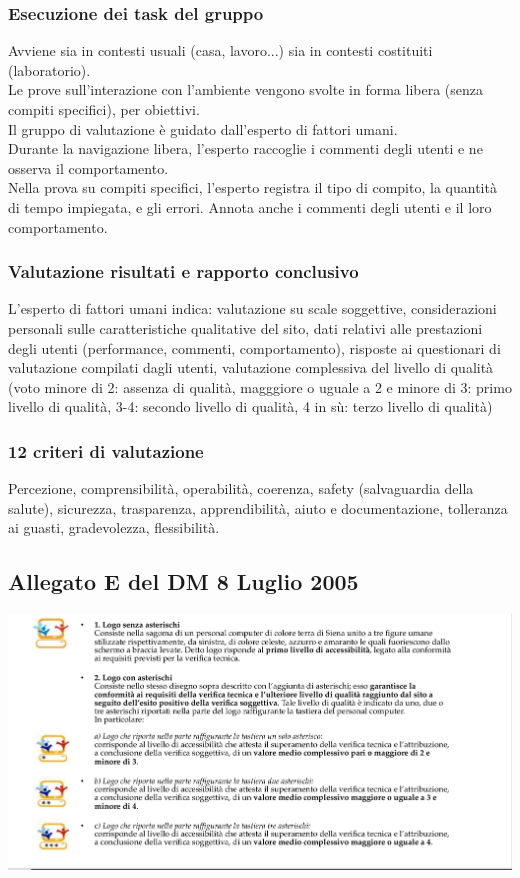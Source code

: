 \documentclass{article}
\begin{document}
\subsubsection{Esecuzione dei task del gruppo}
Avviene sia in contesti usuali (casa, lavoro...) sia in contesti costituiti (laboratorio).\\
Le prove sull'interazione con l'ambiente vengono svolte in forma libera (senza compiti specifici), per obiettivi.\\
Il gruppo di valutazione è guidato dall'esperto di fattori umani.\\
Durante la navigazione libera, l'esperto raccoglie i commenti degli utenti e ne osserva il comportamento.\\
Nella prova su compiti specifici, l'esperto registra il tipo di compito, la quantità di tempo impiegata, e gli errori. Annota anche i commenti degli utenti e il loro comportamento.
\subsubsection{Valutazione risultati e rapporto conclusivo}
L'esperto di fattori umani indica: valutazione su scale soggettive, considerazioni personali sulle caratteristiche qualitative del sito, dati relativi alle prestazioni degli utenti (performance, commenti, comportamento), risposte ai questionari di valutazione compilati dagli utenti, valutazione complessiva del livello di qualità (voto minore di 2: assenza di qualità, magggiore o uguale a 2 e minore di 3: primo livello di qualità, 3-4: secondo livello di qualità, 4 in sù: terzo livello di qualità)
\subsubsection{12 criteri di valutazione}
Percezione, comprensibilità, operabilità, coerenza, safety (salvaguardia della salute), sicurezza, trasparenza, apprendibilità, aiuto e documentazione, tolleranza ai guasti, gradevolezza, flessibilità.
\subsection{Allegato E del DM 8 Luglio 2005}
\includegraphics[width=16cm]{allE}\\
\end{document}

